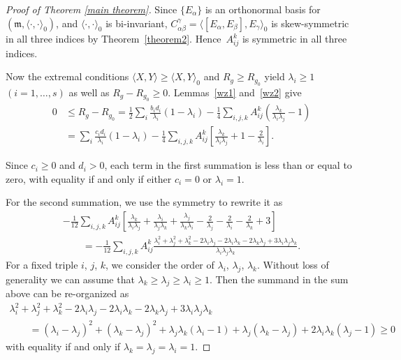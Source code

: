 \documentclass[pdftex]{sigma}
\begin{document}
\begin{proof}[Proof of Theorem \ref{main theorem}]
Since $\{E_{\alpha}\}$ is an orthonormal basis for $(\mathfrak{m}, \langle \cdot, \cdot \rangle_0)$, and $\langle \cdot, \cdot \rangle_0$ is bi-invariant, $C_{\alpha\beta}^{\gamma}=\langle [E_{\alpha},E_{\beta}], E_{\gamma} \rangle_0$ is skew-symmetric in all three indices by Theorem~\ref{theorem2}. Hence~$A^k_{ij}$ is symmetric in all three indices.

Now the extremal conditions $\langle X,Y\rangle\geq \langle X,Y\rangle_0$
and $R_g\geq R_{g_0}$ yield $\lambda_{i}\geq 1$ $(i=1,\dots,s)$ as well as $R_g- R_{g_0} \geq 0$. %
Lemmas~\ref{wz1} and~\ref{wz2} give
\begin{align*}
	0&\leq R_g- R_{g_0} = \frac{1}{2} \sum_{i} \frac{b_id_i}{\lambda_i} (1-\lambda_i) -\frac{1}{4} \sum_{i, j, k}A^k_{ij} \left(\frac{\lambda_{k}}{\lambda_i\lambda_{j}}-1\right) \\
	&= \sum_{i} \frac{c_id_i}{\lambda_i} (1-\lambda_i) -\frac{1}{4} \sum_{i, j, k}A^k_{ij}\left[ \frac{\lambda_{k}}{\lambda_i\lambda_{j }} +1 - \frac{2}{\lambda_i} \right].
\end{align*}

Since $c_i\geq 0$ and $d_i>0$, each term in the first summation is less than or equal to zero, with equality if and only if either $c_i=0$ or $\lambda_i=1$.

For the second summation, we use the symmetry to rewrite it as
\begin{gather*}
-\frac{1}{12} \sum_{i, j, k} A^k_{ij}\left[ \frac{\lambda_{k}}{\lambda_i\lambda_{j }} +\frac{\lambda_{i}}{\lambda_j\lambda_{k}} +\frac{\lambda_{j}}{\lambda_k\lambda_{i}} - \frac{2}{\lambda_j} - \frac{2}{\lambda_i} - \frac{2}{\lambda_k}+3 \right] \\
\qquad{} =-\frac{1}{12} \sum_{i, j, k} A^k_{ij} \frac{\lambda_i^2+\lambda_j^2+\lambda_k^2-2\lambda_i\lambda_j-2\lambda_i\lambda_k-2\lambda_k\lambda_j+3\lambda_i \lambda_j\lambda_k}{\lambda_i\lambda_j\lambda_k} .
\end{gather*}
For a fixed triple $i$, $j$, $k$, we consider the order of $\lambda_{i}$, $\lambda_{j}$, $\lambda_{k}$. Without loss of generality we can assume that $\lambda_{k}\geq \lambda_{j}\geq \lambda_{i}\geq 1$. Then the summand in the sum above can be re-organized as
\begin{gather*}
 \lambda_i^2+\lambda_j^2+\lambda_k^2-2\lambda_i\lambda_j-2\lambda_i\lambda_k-2\lambda_k\lambda_j+3\lambda_i \lambda_j\lambda_k \\
\qquad{} =  (\lambda_i-\lambda_j)^2+(\lambda_k-\lambda_j)^2+\lambda_j\lambda_k(\lambda_i-1)+\lambda_j (\lambda_k-\lambda_j)+2\lambda_i\lambda_k(\lambda_j-1)
 \geq 0
\end{gather*}
with equality if and only if $\lambda_{k}= \lambda_{j}= \lambda_{i}=1$.


\end{proof}
\end{document}

